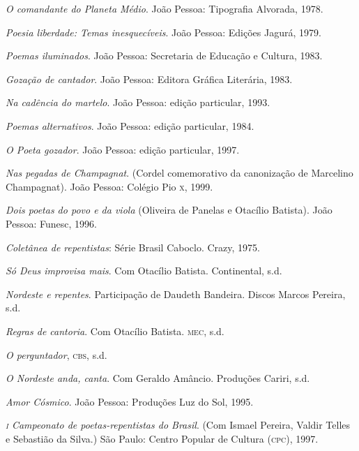\begin{bibliohedra}[]


\bigskip
{}


\tit{}\textit{O comandante do Planeta Médio}. João Pessoa: Tipografia Alvorada, 1978.

\tit{}\textit{Poesia liberdade: Temas inesquecíveis}. João Pessoa: Edições Jagurá, 1979.

\tit{}\textit{Poemas iluminados}. João Pessoa: Secretaria de Educação e Cultura, 1983.

\tit{}\textit{Gozação de cantador}. João Pessoa: Editora Gráfica Literária, 1983.

\tit{}\textit{Na cadência do martelo}. João Pessoa: edição particular, 1993.

\tit{}\textit{Poemas alternativos}. João Pessoa: edição particular, 1984.

\tit{}\textit{O Poeta gozador}. João Pessoa: edição particular, 1997.

\tit{}\textit{Nas pegadas de Champagnat}. (Cordel comemorativo da canonização de Marcelino Champagnat). João Pessoa: Colégio
Pio \textsc{x}, 1999.

\tit{}\textit{Dois poetas do povo e da viola} (Oliveira de Panelas e Otacílio Batista). João Pessoa: Funesc, 1996.

\bigskip
{}


\tit{}\textit{Coletânea de repentistas}: Série Brasil Caboclo. Crazy, 1975.

\tit{}\textit{Só Deus improvisa mais}. Com Otacílio Batista. Continental, s.d.

\tit{}\textit{Nordeste e repentes}. Participação de Daudeth Bandeira. Discos Marcos Pereira, s.d.

\tit{}\textit{Regras de cantoria}. Com Otacílio Batista. \textsc{mec}, s.d.

\tit{}\textit{O perguntador}, \textsc{cbs}, s.d.

\tit{}\textit{O Nordeste anda, canta}. Com Geraldo Amâncio. Produções Cariri, s.d.


\bigskip
{}


\tit{}\textit{Amor Cósmico}. João Pessoa: Produções Luz do Sol, 1995.

\tit{}\textit{\textsc{i} Campeonato de poetas-repentistas do Brasil}. (Com Ismael Pereira, Valdir Telles e Sebastião da Silva.) São
Paulo: Centro Popular de Cultura (\textsc{cpc}), 1997.


\end{bibliohedra}
